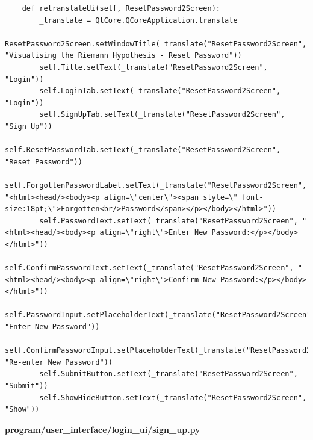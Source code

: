 \documentclass{article}
\begin{document}
\begin{lstlisting}
    def retranslateUi(self, ResetPassword2Screen):
        _translate = QtCore.QCoreApplication.translate
        ResetPassword2Screen.setWindowTitle(_translate("ResetPassword2Screen", "Visualising the Riemann Hypothesis - Reset Password"))
        self.Title.setText(_translate("ResetPassword2Screen", "Login"))
        self.LoginTab.setText(_translate("ResetPassword2Screen", "Login"))
        self.SignUpTab.setText(_translate("ResetPassword2Screen", "Sign Up"))
        self.ResetPasswordTab.setText(_translate("ResetPassword2Screen", "Reset Password"))
        self.ForgottenPasswordLabel.setText(_translate("ResetPassword2Screen", "<html><head/><body><p align=\"center\"><span style=\" font-size:18pt;\">Forgotten<br/>Password</span></p></body></html>"))
        self.PasswordText.setText(_translate("ResetPassword2Screen", "<html><head/><body><p align=\"right\">Enter New Password:</p></body></html>"))
        self.ConfirmPasswordText.setText(_translate("ResetPassword2Screen", "<html><head/><body><p align=\"right\">Confirm New Password:</p></body></html>"))
        self.PasswordInput.setPlaceholderText(_translate("ResetPassword2Screen", "Enter New Password"))
        self.ConfirmPasswordInput.setPlaceholderText(_translate("ResetPassword2Screen", "Re-enter New Password"))
        self.SubmitButton.setText(_translate("ResetPassword2Screen", "Submit"))
        self.ShowHideButton.setText(_translate("ResetPassword2Screen", "Show"))
\end{lstlisting}


\textbf{program/user\_interface/login\_ui/sign\_up.py}
\end{document}
